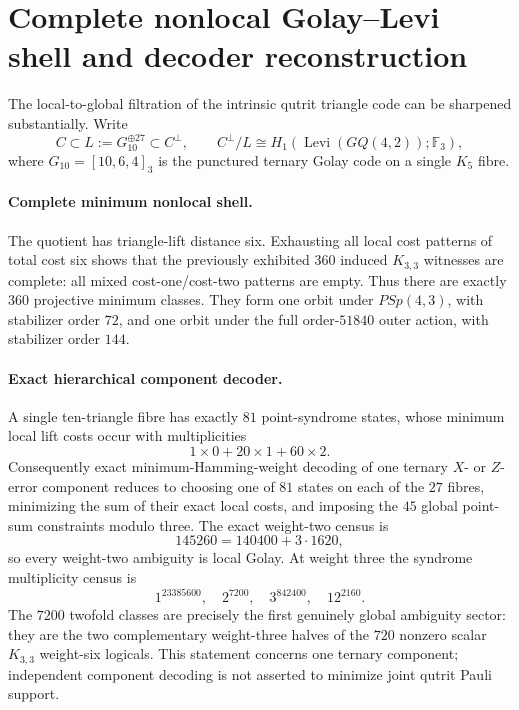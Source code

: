 \section{Complete nonlocal Golay--Levi shell and decoder reconstruction}
\label{sec:pass4809-4816-golay-levi}

The local-to-global filtration of the intrinsic qutrit triangle code can be sharpened substantially.  Write
\[
 C\subset L:=G_{10}^{\oplus 27}\subset C^\perp,
 \qquad
 C^\perp/L\cong H_1(\operatorname{Levi}(GQ(4,2));\mathbb F_3),
\]
where $G_{10}=[10,6,4]_3$ is the punctured ternary Golay code on a single $K_5$ fibre.

\paragraph{Complete minimum nonlocal shell.}
The quotient has triangle-lift distance six.  Exhausting all local cost patterns of total cost six shows that the previously exhibited $360$ induced $K_{3,3}$ witnesses are complete: all mixed cost-one/cost-two patterns are empty.  Thus there are exactly $360$ projective minimum classes.  They form one orbit under $PSp(4,3)$, with stabilizer order $72$, and one orbit under the full order-$51840$ outer action, with stabilizer order $144$.

\paragraph{Exact hierarchical component decoder.}
A single ten-triangle fibre has exactly $81$ point-syndrome states, whose minimum local lift costs occur with multiplicities
\[
 1\times0+20\times1+60\times2.
\]
Consequently exact minimum-Hamming-weight decoding of one ternary $X$- or $Z$-error component reduces to choosing one of $81$ states on each of the $27$ fibres, minimizing the sum of their exact local costs, and imposing the $45$ global point-sum constraints modulo three.  The exact weight-two census is
\[
 145260=140400+3\cdot1620,
\]
so every weight-two ambiguity is local Golay.  At weight three the syndrome multiplicity census is
\[
 1^{23385600},\quad 2^{7200},\quad 3^{842400},\quad 12^{2160}.
\]
The $7200$ twofold classes are precisely the first genuinely global ambiguity sector: they are the two complementary weight-three halves of the $720$ nonzero scalar $K_{3,3}$ weight-six logicals.  This statement concerns one ternary component; independent component decoding is not asserted to minimize joint qutrit Pauli support.

